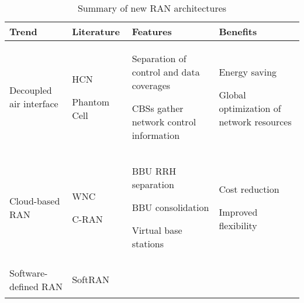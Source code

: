 \documentclass[12pt, draftclsnofoot,onecolumn]{IEEEtran}
\makeatletter
\let\savespace\@minipagetrue
\makeatother
\begin{document}
\begin{table}[!t]
  \centering
  \caption{Summary of new RAN architectures}
  \label{tab:arches}
  \begin{tabularx}{\textwidth}{|l|X|X|X|}
    \hline
    Trend & Literature & Features & Benefits \\
    \hline
    Decoupled air interface & \savespace
    \begin{compactitem}
    \item  HCN~\cite{niu2012energy}
    \item  Phantom Cell~\cite{ishii2012novel}
    \end{compactitem}
    & \savespace
    \begin{compactitem}
      \item Separation of control and data coverages
      \item CBSs gather network control information
    \end{compactitem} & \savespace
    \begin{compactitem}
      \item Energy saving
      \item Global optimization of network resources
    \end{compactitem} \\
    \hline
    Cloud-based RAN & \savespace
    \begin{compactitem}
    \item WNC~\cite{lin2010wireless}
    \item C-RAN~\cite{cmri2013cran}
    \end{compactitem} & \savespace
    \begin{compactitem}
      \item BBU RRH separation
      \item BBU consolidation
      \item Virtual base stations
    \end{compactitem} & \savespace
    \begin{compactitem}
      \item Cost reduction
      \item Improved flexibility
    \end{compactitem} \\
    \hline
    Software-defined RAN & \savespace
    \begin{compactitem}
    \item SoftRAN~\cite{gudipati2013softran}
    \end{compactitem} & \savespace
    \begin{compactitem}

\end{compactitem}
\end{tabularx}
\end{table}
\end{document}
